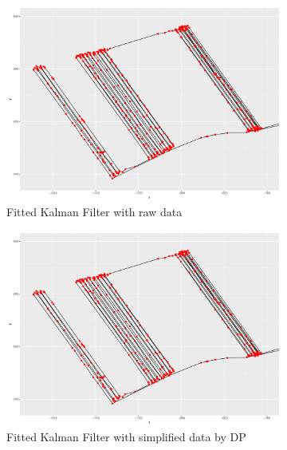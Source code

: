 \begin{figure}
\centering
\begin{subfigure}[t]{0.47\textwidth}
\includegraphics[width=\linewidth]{Chapters/06Spinoff/plot/ggRawKF2.pdf}
\caption{Fitted Kalman Filter with raw data}
\end{subfigure}
 \begin{subfigure}[t]{0.47\textwidth}
\includegraphics[width=\linewidth]{Chapters/06Spinoff/plot/ggDPKF2.pdf}
\caption{Fitted Kalman Filter with simplified data by DP}
\end{subfigure}
 \begin{subfigure}[t]{0.47\textwidth}

\end{subfigure}
\end{figure}

